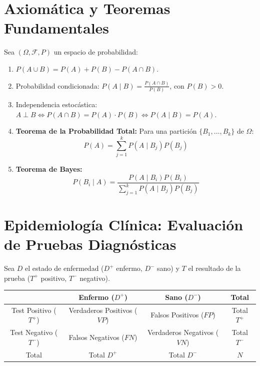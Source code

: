 \documentclass[11pt,a4paper]{report}
\theoremstyle{definition}
\begin{document}
\section{Axiomática y Teoremas Fundamentales}
Sea $(\Omega, \mathcal{F}, P)$ un espacio de probabilidad:
\begin{enumerate}[leftmargin=*]
    \item $P(A \cup B) = P(A) + P(B) - P(A \cap B)$.
    \item Probabilidad condicionada: $P(A \mid B) = \frac{P(A \cap B)}{P(B)}$, con $P(B) > 0$.
    \item Independencia estocástica: $A \perp B \iff P(A \cap B) = P(A) \cdot P(B) \iff P(A \mid B) = P(A)$.
    \item \textbf{Teorema de la Probabilidad Total:} Para una partición $\{B_1, \dots, B_k\}$ de $\Omega$:
    \begin{equation}
    P(A) = \sum_{j=1}^k P(A \mid B_j) P(B_j)
    \end{equation}
    \item \textbf{Teorema de Bayes:}
    \begin{equation}
    P(B_i \mid A) = \frac{P(A \mid B_i) P(B_i)}{\sum_{j=1}^k P(A \mid B_j) P(B_j)}
    \end{equation}
\end{enumerate}

\section{Epidemiología Clínica: Evaluación de Pruebas Diagnósticas}
Sea $D$ el estado de enfermedad ($D^+$ enfermo, $D^-$ sano) y $T$ el resultado de la prueba ($T^+$ positivo, $T^-$ negativo).

\begin{table}[htbp]
\centering
\begin{tabular}{c|cc|c}
\toprule
 & Enfermo ($D^+$) & Sano ($D^-$) & Total \\
\midrule
Test Positivo ($T^+$) & Verdaderos Positivos ($VP$) & Falsos Positivos ($FP$) & Total $T^+$ \\
Test Negativo ($T^-$) & Falsos Negativos ($FN$) & Verdaderos Negativos ($VN$) & Total $T^-$ \\
\midrule
Total & Total $D^+$ & Total $D^-$ & $N$ \\
\bottomrule
\end{tabular}
\end{table}
\end{document}
